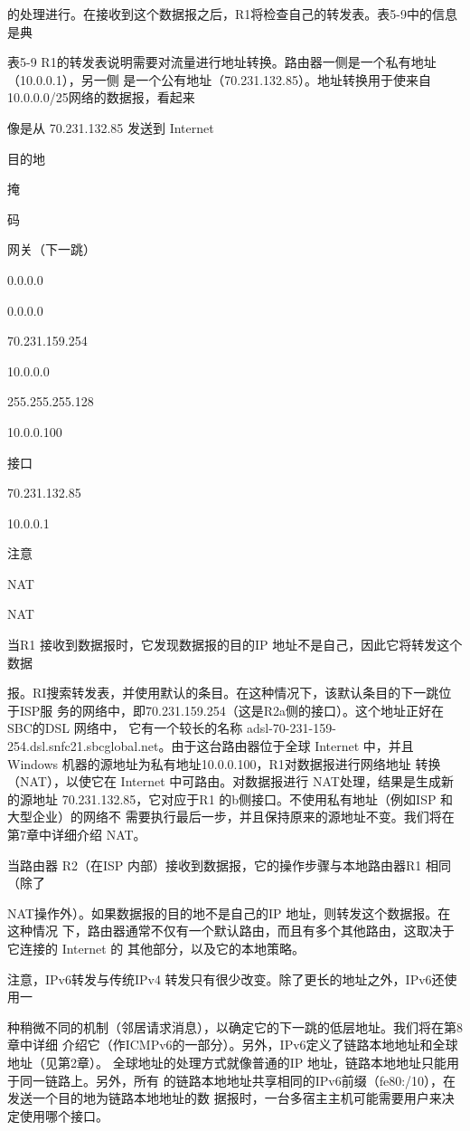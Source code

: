 的处理进行。在接收到这个数据报之后，R1将检查自己的转发表。表5-9中的信息是典

表5-9 R1的转发表说明需要对流量进行地址转换。路由器一侧是一个私有地址（10.0.0.1），另一侧
是一个公有地址（70.231.132.85）。地址转换用于使来自10.0.0.0/25网络的数据报，看起来

像是从 70.231.132.85 发送到 Internet

目的地

掩

码

网关（下一跳）

0.0.0.0

0.0.0.0

70.231.159.254

10.0.0.0

255.255.255.128

10.0.0.100

接口

70.231.132.85

10.0.0.1

注意

NAT

NAT

当R1 接收到数据报时，它发现数据报的目的IP 地址不是自己，因此它将转发这个数据

报。RI搜索转发表，并使用默认的条目。在这种情况下，该默认条目的下一跳位于ISP服
务的网络中，即70.231.159.254（这是R2a侧的接口）。这个地址正好在 SBC的DSL 网络中，
它有一个较长的名称 adsl-70-231-159-254.dsl.snfc21.sbcglobal.net。由于这台路由器位于全球
Internet 中，并且 Windows 机器的源地址为私有地址10.0.0.100，R1对数据报进行网络地址
转换（NAT），以使它在 Internet 中可路由。对数据报进行 NAT处理，结果是生成新的源地址
70.231.132.85，它对应于R1 的b侧接口。不使用私有地址（例如ISP 和大型企业）的网络不
需要执行最后一步，并且保持原来的源地址不变。我们将在第7章中详细介绍 NAT。

当路由器 R2（在ISP 内部）接收到数据报，它的操作步骤与本地路由器R1 相同（除了

NAT操作外）。如果数据报的目的地不是自己的IP 地址，则转发这个数据报。在这种情况
下，路由器通常不仅有一个默认路由，而且有多个其他路由，这取决于它连接的 Internet 的
其他部分，以及它的本地策略。

注意，IPv6转发与传统IPv4 转发只有很少改变。除了更长的地址之外，IPv6还使用一

种稍微不同的机制（邻居请求消息），以确定它的下一跳的低层地址。我们将在第8章中详细
介绍它（作ICMPv6的一部分）。另外，IPv6定义了链路本地地址和全球地址（见第2章）。
全球地址的处理方式就像普通的IP 地址，链路本地地址只能用于同一链路上。另外，所有
的链路本地地址共享相同的IPv6前缀（fe80:/10），在发送一个目的地为链路本地地址的数
据报时，一台多宿主主机可能需要用户来决定使用哪个接口。

